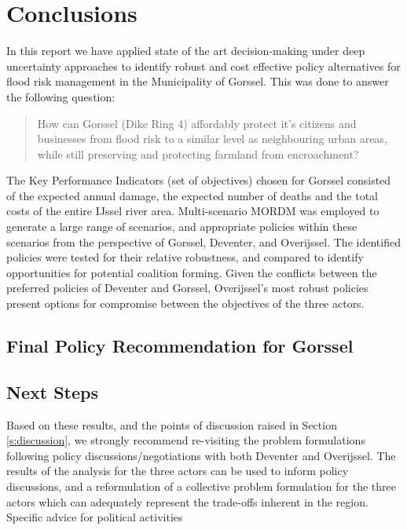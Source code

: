 \section{Conclusions}
\label{s:conc}


In this report we have applied state of the art decision-making under deep uncertainty approaches to identify robust and cost effective policy alternatives for flood risk management in the Municipality of Gorssel. This was done to answer the following question:
\begin{quote}
    How can Gorssel (Dike Ring 4) affordably protect it's citizens and businesses from flood risk to a similar level as neighbouring urban areas, while still preserving and protecting farmland from encroachment?
\end{quote} 

The Key Performance Indicators (set of objectives) chosen for Gorssel consisted of the expected annual damage, the expected number of deaths and the total costs of the entire IJssel river area. Multi-scenario MORDM was employed to generate a large range of scenarios, and appropriate policies within these scenarios from the perspective of Gorssel, Deventer, and Overijssel. The identified policies were tested for their relative robustness, and compared to identify opportunities for potential coalition forming. Given the conflicts between the preferred policies of Deventer and Gorssel, Overijssel's most robust policies present options for compromise between the objectives of the three actors.

\subsection{Final Policy Recommendation for Gorssel}


\subsection{Next Steps}
Based on these results, and the points of discussion raised in Section \ref{s:discussion}, we strongly recommend re-visiting the problem formulations following policy discussions/negotiations with both Deventer and Overijssel. The results of the analysis for the three actors can be used to inform policy discussions, and a reformulation of a collective problem formulation for the three actors which can adequately represent the trade-offs inherent in the region. Specific advice for political activities 

